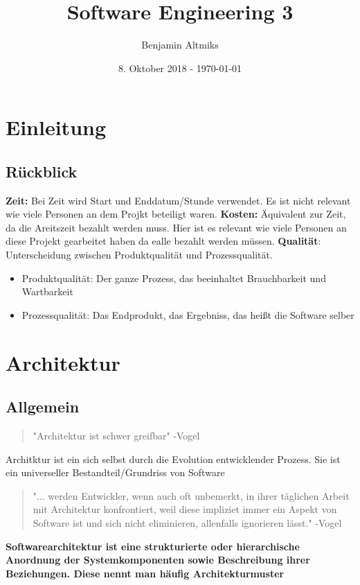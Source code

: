 \documentclass[a4paper,10pt]{scrartcl}
\title{Software Engineering 3}
\author{Benjamin Altmiks}
\date{8. Oktober 2018 - \today}
\begin{document}
\tableofcontents
\maketitle

\section{Einleitung}
\subsection{Rückblick}
        \textbf{Zeit:}      Bei Zeit wird Start und Enddatum/Stunde verwendet. Es ist nicht relevant wie viele Personen an dem Projkt beteiligt waren.
\newline\textbf{Kosten:}    Äquivalent zur Zeit, da die Areitszeit bezahlt werden muss. 
                                Hier ist es relevant wie viele Personen an diese Projekt gearbeitet haben da ealle bezahlt werden müssen.
\newline\textbf{Qualität}:   Unterscheidung zwischen Produktqualität und Prozessqualität.
\begin{itemize}
    \item Produktqualität: Der ganze Prozess, das beeinhaltet Brauchbarkeit und Wartbarkeit 
    \item Prozessqualität: Das Endprodukt, das Ergebniss, das heißt die Software selber
\end{itemize}
\section{Architektur}
\subsection{Allgemein}
\begin{quote}   "Architektur ist schwer greifbar" \newline -Vogel   \end{quote}
Architktur ist ein sich selbst durch die Evolution entwicklender Prozess. Sie ist ein universeller Bestandteil/Grundriss von Software
\begin{quote}    "... werden Entwickler, wenn auch oft unbemerkt, in ihrer täglichen Arbeit mit Architektur konfrontiert, weil diese impliziet immer ein Aspekt von
Software ist und sich nicht eliminieren, allenfalls ignorieren lässt." \newline -Vogel    \end{quote}
\textbf{Softwarearchitektur ist eine strukturierte oder hierarchische Anordnung der Systemkomponenten sowie Beschreibung ihrer Beziehungen. Diese nennt man häufig Architekturmuster}
\newpage
\end{document}
